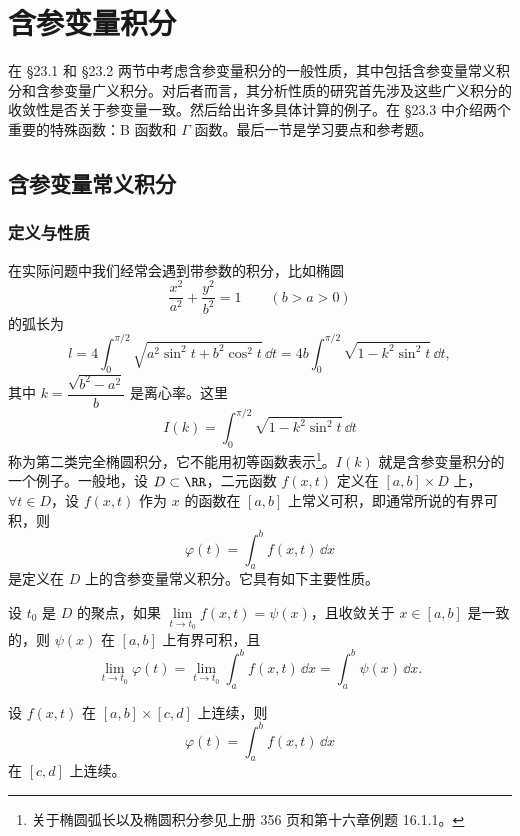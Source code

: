 \chapter{含参变量积分}


在 §23.1 和 §23.2 两节中考虑含参变量积分的一般性质，其中包括含参变量常义积分和含参变量广义积分。对后者而言，其分析性质的研究首先涉及这些广义积分的收敛性是否关于参变量一致。然后给出许多具体计算的例子。在 §23.3 中介绍两个重要的特殊函数：B 函数和 $\Gamma$ 函数。最后一节是学习要点和参考题。

\section{含参变量常义积分}

\subsection{定义与性质}

在实际问题中我们经常会遇到带参数的积分，比如椭圆
\[
  \frac{x^2}{a^2}+\frac{y^2}{b^2}=1\qquad (b>a>0)
\]
的弧长为
\[
  l=4\int_0^{\pi/2}\sqrt{a^2\sin^2 t+b^2\cos^2 t}\,\dd t
  =4b\int_0^{\pi/2}\sqrt{1-k^2\sin^2 t}\,\dd t,
\]
其中 $k=\dfrac{\sqrt{b^2-a^2}}{b}$ 是离心率。这里
\[
  I(k)=\int_0^{\pi/2}\sqrt{1-k^2\sin^2 t}\,\dd t
\]
称为第二类完全椭圆积分，它不能用初等函数表示\footnote{关于椭圆弧长以及椭圆积分参见上册 356 页和第十六章例题 16.1.1。}。$I(k)$ 就是含参变量积分的一个例子。一般地，设 $D\subset\RR$，二元函数 $f(x,t)$ 定义在 $[a,b]\times D$ 上，$\forall t\in D$，设 $f(x,t)$ 作为 $x$ 的函数在 $[a,b]$ 上常义可积，即通常所说的有界可积，则
\[
  \varphi(t)=\int_a^b f(x,t)\,\dd x
\]
是定义在 $D$ 上的含参变量常义积分。它具有如下主要性质。

\begin{xproposition}[23.1.1（极限性质）]
设 $t_0$ 是 $D$ 的聚点，如果 $\lim\limits_{t\to t_0}f(x,t)=\psi(x)$，且收敛关于 $x\in[a,b]$ 是一致的，则 $\psi(x)$ 在 $[a,b]$ 上有界可积，且
\[
  \lim_{t\to t_0}\varphi(t)
  =\lim_{t\to t_0}\int_a^b f(x,t)\,\dd x
  =\int_a^b\psi(x)\,\dd x.
\]
\end{xproposition}

\begin{xproposition}[23.1.2（连续性）]
设 $f(x,t)$ 在 $[a,b]\times[c,d]$ 上连续，则
\[
  \varphi(t)=\int_a^b f(x,t)\,\dd x
\]
在 $[c,d]$ 上连续。
\end{xproposition}

